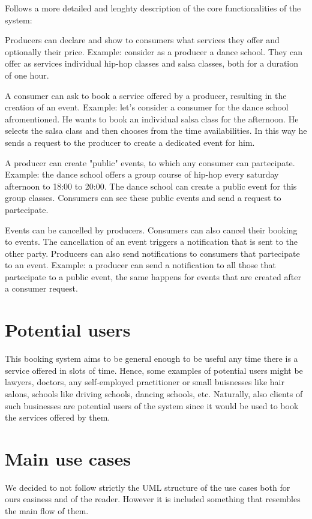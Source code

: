 \documentclass{article}
\begin{document}
Follows a more detailed and lenghty description of the core functionalities
of the system:

Producers can declare and show to consumers what services they offer and
optionally their price.
Example: consider as a producer a dance school. They can offer as services
individual hip-hop classes and salsa classes, both for a duration of one hour.

A consumer can ask to book a service offered by a producer, resulting in the
creation of an event.
Example: let's consider a consumer for the dance school afromentioned. He wants
to book an individual salsa class for the afternoon. He selects the salsa class
and then chooses from the time availabilities. In this way he sends a request
to the producer to create a dedicated event for him.

A producer can create "public" events, to which any consumer can partecipate.
Example: the dance school offers a group course of hip-hop every saturday
afternoon to 18:00 to 20:00. The dance school can create a public event for this
group classes. Consumers can see these public events and send a request to
partecipate.

Events can be cancelled by producers. Consumers can also cancel their booking
to events. The cancellation of an event triggers a notification that is sent
to the other party.
Producers can also send notifications to consumers that partecipate to an event.
Example: a producer can send a notification to all those that partecipate
to a public event, the same happens for events that are created after a consumer
request.

\section{Potential users}
This booking system aims to be general enough to be
useful any time there is a service offered in slots of time. Hence, some
examples of potential users might be lawyers, doctors, any self-employed
practitioner or small buisnesses like hair salons, schools like driving
schools, dancing schools, etc. Naturally, also clients of such businesses are
potential users of the system since it would be used to book the services
offered by them.

\section{Main use cases}

We decided to not follow strictly the UML structure of the use cases both for ours
easiness and of the reader. However it is included something that resembles the
main flow of them.
\end{document}
